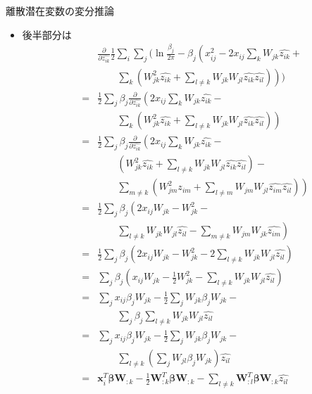 \documentclass[dvipdfmx,notheorems,t]{beamer}
\begin{document}
\begin{frame}{離散潜在変数の変分推論}
\begin{itemize}
\begin{itemize}
		\item 後半部分は
		\begin{eqnarray}
			&& \frac{\partial}{\partial \widehat{z_{ik}}} \frac{1}{2} \sum_i \sum_j \Bigg( \ln \frac{\beta_j}{2\pi} - \beta_j \left( x_{ij}^2 - 2 x_{ij} \sum_k W_{jk} \widehat{z_{ik}} + \right. \nonumber \\
			&& \qquad \left. \sum_k \left( W_{jk}^2 \widehat{z_{ik}} + \sum_{l \neq k} W_{jk} W_{jl} \widehat{z_{ik}} \widehat{z_{il}} \right) \right) \Bigg) \\
			&=& \frac{1}{2} \sum_j \beta_j \frac{\partial}{\partial \widehat{z_{ik}}} \left( 2 x_{ij} \sum_k W_{jk} \widehat{z_{ik}} - \right. \nonumber \\
			&& \qquad \left. \sum_k \left( W_{jk}^2 \widehat{z_{ik}} + \sum_{l \neq k} W_{jk} W_{jl} \widehat{z_{ik}} \widehat{z_{il}} \right) \right) \\
			&=& \frac{1}{2} \sum_j \beta_j \frac{\partial}{\partial \widehat{z_{ik}}} \left( 2 x_{ij} \sum_k W_{jk} \widehat{z_{ik}} - \right. \nonumber \\
			&& \qquad \left( W_{jk}^2 \widehat{z_{ik}} + \sum_{l \neq k} W_{jk} W_{jl} \widehat{z_{ik}} \widehat{z_{il}} \right) - \nonumber \\
			&& \qquad \left. \sum_{m \neq k} \left( W_{jm}^2 \widehat{z_{im}} + \sum_{l \neq m} W_{jm} W_{jl} \widehat{z_{im}} \widehat{z_{il}} \right) \right) \\
			&=& \frac{1}{2} \sum_j \beta_j \left( 2 x_{ij} W_{jk} - W_{jk}^2 - \right. \nonumber \\
			&& \qquad \left. \sum_{l \neq k} W_{jk} W_{jl} \widehat{z_{il}} - \sum_{m \neq k} W_{jm} W_{jk} \widehat{z_{im}} \right) \\
			&=& \frac{1}{2} \sum_j \beta_j \left( 2 x_{ij} W_{jk} - W_{jk}^2 - 2 \sum_{l \neq k} W_{jk} W_{jl} \widehat{z_{il}} \right) \\
			&=& \sum_j \beta_j \left( x_{ij} W_{jk} - \frac{1}{2} W_{jk}^2 - \sum_{l \neq k} W_{jk} W_{jl} \widehat{z_{il}} \right) \\
			&=& \sum_j x_{ij} \beta_j W_{jk} - \frac{1}{2} \sum_j W_{jk} \beta_j W_{jk} - \nonumber \\
			&& \qquad \sum_j \beta_j \sum_{l \neq k} W_{jk} W_{jl} \widehat{z_{il}} \\
			&=& \sum_j x_{ij} \beta_j W_{jk} - \frac{1}{2} \sum_j W_{jk} \beta_j W_{jk} - \nonumber \\
			&& \qquad \sum_{l \neq k} \left( \sum_j W_{jl} \beta_j W_{jk} \right) \widehat{z_{il}} \\
			&=& \bm{x}_i^T \bm{\beta} \bm{W}_{:k} - \frac{1}{2} \bm{W}_{:k}^T \bm{\beta} \bm{W}_{:k} - \sum_{l \neq k} \bm{W}_{:l}^T \bm{\beta} \bm{W}_{:k} \widehat{z_{il}}
		\end{eqnarray}
		

\end{itemize}
\end{itemize}
\end{frame}
\end{document}
